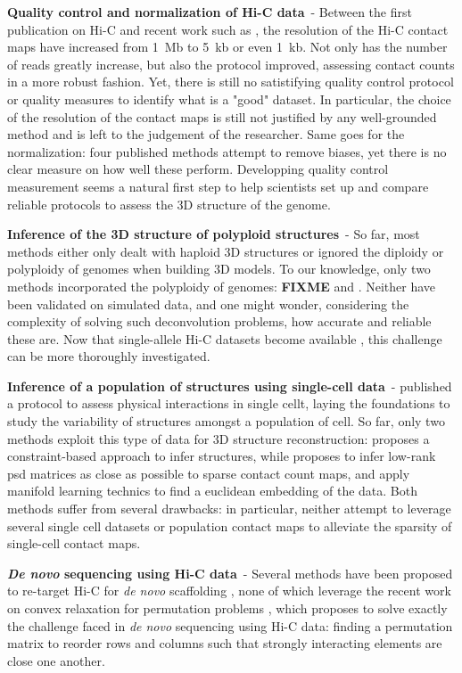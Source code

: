 \textbf{Quality control and normalization of Hi-C data}\ -
Between the first publication on Hi-C \citep{lieberman-aiden:comprehensive}
and recent work such as \citet{rao:3d, jin:high-resolution}, the resolution of
the Hi-C contact maps have increased from 1~Mb to 5~kb or even 1~kb. Not only
has the number of reads greatly increase, but also the protocol improved,
assessing contact counts in a more robust fashion. Yet, there is still no
satistifying quality control protocol or quality measures to identify what is
a "good" dataset. In particular, the choice of the resolution of the contact
maps is still not justified by any well-grounded method and is left to the
judgement of the researcher. Same goes for the normalization: four published
methods attempt to remove biases, yet there is no clear measure on how well
these perform. Developping quality control measurement seems a natural first
step to help scientists set up and compare reliable protocols to assess the 3D
structure of the genome.

\textbf{Inference of the 3D structure of polyploid structures}\ - So far, most
methods either only dealt with haploid 3D structures or ignored the diploidy
or polyploidy of genomes when building 3D models. To our knowledge, only two
methods incorporated the polyploidy of genomes: \textbf{FIXME} and
\citet{ay:identifying}. Neither have been validated on simulated data, and
one might wonder, considering the complexity of solving such deconvolution
problems, how accurate and reliable these are. Now that single-allele Hi-C
datasets become available \citep{deng:bipartite}, this challenge can be more
thoroughly investigated.

\textbf{Inference of a population of structures using single-cell data}\ -
\citet{nagano:single-cell} published a protocol to assess physical
interactions in single cellt, laying the foundations to study the variability
of structures amongst a population of cell. So far, only two methods exploit
this type of data for 3D structure reconstruction: \citet{nagano:single-cell}
proposes a constraint-based approach to infer structures, while
\citet{paulsen:manifold} proposes to infer low-rank psd matrices as close as
possible to sparse contact count maps, and apply manifold learning technics to
find a euclidean embedding of the data. Both methods suffer from several
drawbacks: in particular, neither attempt to leverage several single cell
datasets or population contact maps to alleviate the sparsity of single-cell
contact maps.

\textbf{\textit{De novo} sequencing using Hi-C data}\ - Several methods have
been proposed to re-target Hi-C for \textit{de novo} scaffolding
\citep{burton:chromosome, kaplan:high-throughput, marie-nelly:high-quality},
none of which leverage the recent work on convex relaxation for permutation
problems \citet{fogel:convex}, which proposes to solve exactly the challenge
faced in \textit{de novo} sequencing using Hi-C data: finding a permutation
matrix to reorder rows and columns such that strongly interacting elements are
close one another.

